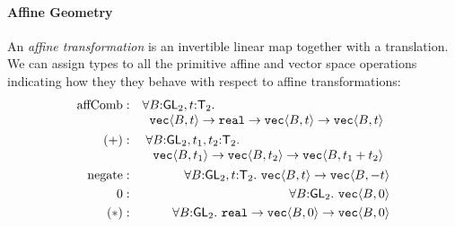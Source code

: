 \documentclass{sigplanconf}
\newcommand{\SynGL}[1]{\mathsf{GL}_#1}
\newcommand{\SynTransl}[1]{\mathsf{T}_#1}
\newcommand{\tyPrim}[2]{\textup{\texttt{#1}}\langle #2 \rangle}
\newcommand{\tyPrimNm}[1]{\textup{\texttt{#1}}}
\theoremstyle{examplestyle}
\theoremstyle{restatementstyle}
\begin{document}
\paragraph{Affine Geometry} An \emph{affine transformation} is
an invertible linear map together with a translation. We can assign
types to all the primitive affine and vector space operations
indicating how they they behave with respect to affine
transformations:
\begin{eqnarray*}
  \mathrm{affComb} & : &
  \begin{array}[t]{@{}l}
    \forall B \mathord: \SynGL{2}, t \mathord: \SynTransl{2}.\\
    \hspace{0.2cm} \tyPrim{vec}{B,t} \to \tyPrimNm{real} \to
    \tyPrim{vec}{B,t} \to \tyPrim{vec}{B,t}
  \end{array}
  \\
  (+) & : &
  \begin{array}[t]{@{}l}
    \forall B \mathord: \SynGL{2}, t_1,t_2 \mathord: \SynTransl{2}. \\
    \hspace{0.2cm}\tyPrim{vec}{B,t_1} \to \tyPrim{vec}{B,t_2} \to
    \tyPrim{vec}{B,t_1 + t_2}
  \end{array}
  \\
  \mathrm{negate} & : & \forall B \mathord: \SynGL{2}, t \mathord: \SynTransl{2}.\ \tyPrim{vec}{B,t} \to \tyPrim{vec}{B,-t} \\
  0 & : & \forall B \mathord: \SynGL{2}.\ \tyPrim{vec}{B,0} \\
  (*) & : & \forall B \mathord: \SynGL{2}.\ \tyPrimNm{real} \to \tyPrim{vec}{B,0} \to \tyPrim{vec}{B,0}
\end{eqnarray*}
\end{document}
